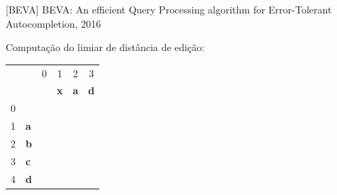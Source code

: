 \documentclass[11pt]{beamer}
\begin{document}
\begin{frame}{[BEVA] BEVA: An efficient Query Processing algorithm for Error-Tolerant Autocompletion, 2016}

    Computação do limiar de distância de edição:
  
    \begin{table}[]
    \begin{tabular}{llllll}
     &  & \multicolumn{1}{c}{{\color[HTML]{656565} 0}} & \multicolumn{1}{c}{{\color[HTML]{656565} 1}} & \multicolumn{1}{c}{{\color[HTML]{656565} 2}} & \multicolumn{1}{c}{{\color[HTML]{656565} 3}} \\
     &  &  & \textbf{x} & \textbf{a} & \textbf{d} \\ \cline{3-6} 
    {\color[HTML]{656565} 0} & \multicolumn{1}{l|}{} & \multicolumn{1}{l|}{} & \multicolumn{1}{l|}{} & \multicolumn{1}{l|}{} & \multicolumn{1}{l|}{} \\ \cline{3-6} 
    {\color[HTML]{656565} 1} & \multicolumn{1}{l|}{\textbf{a}} & \multicolumn{1}{l|}{} & \multicolumn{1}{l|}{} & \multicolumn{1}{l|}{} & \multicolumn{1}{l|}{} \\ \cline{3-6} 
    {\color[HTML]{656565} 2} & \multicolumn{1}{l|}{\textbf{b}} & \multicolumn{1}{c|}{} & \multicolumn{1}{c|}{} & \multicolumn{1}{c|}{} & \multicolumn{1}{c|}{} \\ \cline{3-6} 
    {\color[HTML]{656565} 3} & \multicolumn{1}{l|}{\textbf{c}} & \multicolumn{1}{l|}{} & \multicolumn{1}{l|}{} & \multicolumn{1}{l|}{} & \multicolumn{1}{l|}{} \\ \cline{3-6} 
    {\color[HTML]{656565} 4} & \multicolumn{1}{l|}{\textbf{d}} & \multicolumn{1}{c|}{} & \multicolumn{1}{c|}{} & \multicolumn{1}{c|}{} & \multicolumn{1}{c|}{} \\ \cline{3-6} 
    \end{tabular}
    \end{table}
    
\end{frame}
\end{document}
